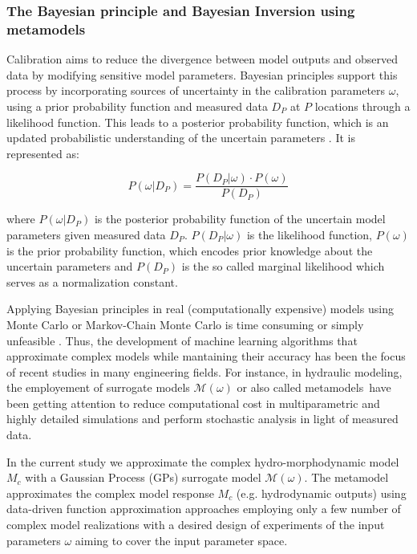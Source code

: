 \documentclass[draft,linenumbers,onecolumn]{agujournal2019} %
\begin{document}
\subsubsection{The Bayesian principle and Bayesian Inversion using metamodels}

Calibration aims to reduce the divergence between model outputs and observed data by modifying sensitive model parameters. Bayesian principles support this process by incorporating sources of uncertainty in the calibration parameters \(\omega\), using a prior probability function and measured data \( D_P \)  at \( P \) locations through a likelihood function. This leads to a posterior probability function, which is an updated probabilistic understanding of the uncertain parameters  \cite{smith1992bayesian,lim2017comprehensive}. It is represented as: 

\[
P(\omega | D_P) = \frac{P(D_P | \omega) \cdot P(\omega)}{P(D_P)}
\]


where \( P(\omega | D_P) \) is the posterior probability function of the uncertain model parameters given measured data \(D_P\). \(P(D_P | \omega)\)  is the likelihood function,  \( P(\omega) \) is the prior probability function, which encodes prior knowledge about the uncertain parameters and \( P(D_P) \) is the so called marginal likelihood which serves as a normalization constant.  


Applying Bayesian principles in real (computationally expensive) models using Monte Carlo or Markov-Chain Monte Carlo is time consuming or simply unfeasible \cite{oladyshkin2020bayesian3}.
Thus, the development of machine learning algorithms that approximate complex models while mantaining their accuracy has been the focus of recent studies in many engineering fields. For instance, in hydraulic modeling, the employement of surrogate models \( \mathcal{M}(\omega) \)  or also called metamodels have been getting attention to reduce computational cost in  multiparametric and highly detailed simulations and perform stochastic analysis in light of measured data.


In the current study we approximate the complex hydro-morphodynamic model \( M_c \) with a Gaussian Process (GPs) surrogate model \( \mathcal{M}(\omega) \). The metamodel approximates the complex model response \( M_c \) (e.g. hydrodynamic outputs) using data-driven function approximation approaches \cite{razavi2012review} employing only a few number of complex model realizations with a desired design of experiments of the input parameters \(\omega\) aiming to cover the input parameter space. 
\end{document}
